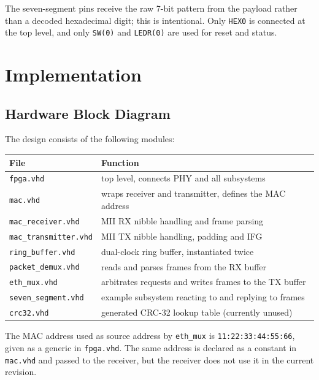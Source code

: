 \documentclass[11pt,a4paper]{article}
\begin{document}
The seven-segment pins receive the raw 7-bit pattern from the payload rather than a decoded hexadecimal digit; this is intentional. Only \texttt{HEX0} is connected at the top level, and only \texttt{SW(0)} and \texttt{LEDR(0)} are used for reset and status.

\newpage

\section{Implementation}

\subsection{Hardware Block Diagram}
The design consists of the following modules:

\begin{center}
\begin{tabular}{ll}
\hline
File & Function \\
\hline
\texttt{fpga.vhd} & top level, connects PHY and all subsystems \\
\texttt{mac.vhd} & wraps receiver and transmitter, defines the MAC address \\
\texttt{mac\_receiver.vhd} & MII RX nibble handling and frame parsing \\
\texttt{mac\_transmitter.vhd} & MII TX nibble handling, padding and IFG \\
\texttt{ring\_buffer.vhd} & dual-clock ring buffer, instantiated twice \\
\texttt{packet\_demux.vhd} & reads and parses frames from the RX buffer \\
\texttt{eth\_mux.vhd} & arbitrates requests and writes frames to the TX buffer \\
\texttt{seven\_segment.vhd} & example subsystem reacting to and replying to frames \\
\texttt{crc32.vhd} & generated CRC-32 lookup table (currently unused) \\
\hline
\end{tabular}
\end{center}

The MAC address used as source address by \texttt{eth\_mux} is \texttt{11:22:33:44:55:66}, given as a generic in \texttt{fpga.vhd}. The same address is declared as a constant in \texttt{mac.vhd} and passed to the receiver, but the receiver does not use it in the current revision.
\end{document}
